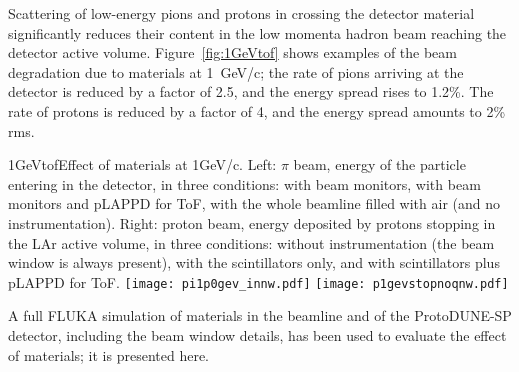  Scattering of low-energy pions and protons in crossing the detector material significantly reduces their content in the low momenta hadron beam reaching the detector active volume.  Figure~\ref{fig:1GeVtof} shows examples of the beam degradation due to materials at 1~GeV/c; the rate of pions arriving at the detector is reduced by a factor of 2.5, and the energy spread rises to 1.2\%. The rate of protons 
 is reduced by a factor of 4, and the energy spread amounts to 2\% rms. 
  \begin{cdrfigure}{1GeVtof}{Effect of materials at  1GeV/c. Left: $\pi$ beam, energy of the particle entering in the detector, in three conditions: with  beam monitors, with beam monitors and pLAPPD for ToF, with the whole beamline filled with air (and no instrumentation). Right: proton beam, energy deposited by protons stopping in the LAr active volume, in three conditions: without instrumentation (the beam window is always present), with the scintillators only, and with scintillators plus pLAPPD for ToF.}
\texttt{[image: pi1p0gev\_innw.pdf]}
\texttt{[image: p1gevstopnoqnw.pdf]}
\end{cdrfigure}



A full FLUKA\cite{fluka05,Fluka15}  simulation of materials in the beamline and of the ProtoDUNE-SP detector, including the beam window details, has been used to evaluate the effect of materials; it is presented here. 

